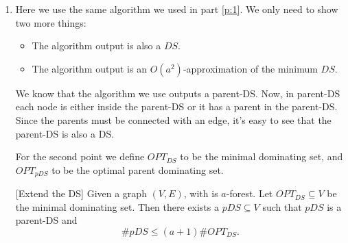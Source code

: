 \documentclass[11pt]{article}
\begin{document}
\begin{enumerate}
\begin{proof}
        The proof simply follows from the fact that $e_i$ can have at most one parent per forest, he might have even less if it is a root in some forest. The total number of parents is no more than $a$. Finally, $e_i \in S_j$ only if $e_j$ is a parent of $e_i$ or $j=i$. Therefore, there are only $a+1$ acceptable sets. 
    \end{proof}
    In the case $a = 1$, then each element is contained by no more than $a+1 = 2$ sets. In this context we have shown in the lecture that there is an algorithm which yields a $2$-approximation. More generally, claim 1.9 from lecture notes gives us an $f$-approximation if every element is contained in at most $f$ sets. This would yield an $a+1$-approximation, which indeed is an $O(a)$-approximation. Once we have found the collection $\{S_{i_1}, S_{i_{2}}, \dots, S_{i_{m}}\}$ that minimizes the risk with our algorithm (in an $a+1$-approximation), we can easily get back to the solution of the original problem by taking $\{e_{i_1},\dots, e_{i_m}\}$ to be our parent-DS
    \item Here we use the same algorithm we used in part \ref{p:1}. We only need to show two more things: 
    \begin{itemize}
        \item The algorithm output is also a $DS$.
        \item The algorithm output is an $O(a^2)$-approximation of the minimum $DS$.
    \end{itemize}
    We know that the algorithm we use outputs a parent-DS. Now, in parent-DS each node is either inside the parent-DS or it has a parent in the parent-DS. Since the parents must be connected with an edge, it's easy to see that the parent-DS is also a DS.

    For the second point we define $OPT_{DS}$ to be the minimal dominating set, and $OPT_{pDS}$ to be the optimal parent dominating set.
    \begin{observation}\label{obs:extend}[Extend the DS] Given a graph $(V,E)$, with is $a$-forest. Let $OPT_{DS} \subseteq V$ be the minimal dominating set. Then there exists a $pDS \subseteq V$ such that $pDS$ is a parent-DS and
        \begin{equation*}
            \#pDS \leq (a+1) \# OPT_{DS}.
        \end{equation*}
    \end{observation} 
    

\end{enumerate}
\end{document}
